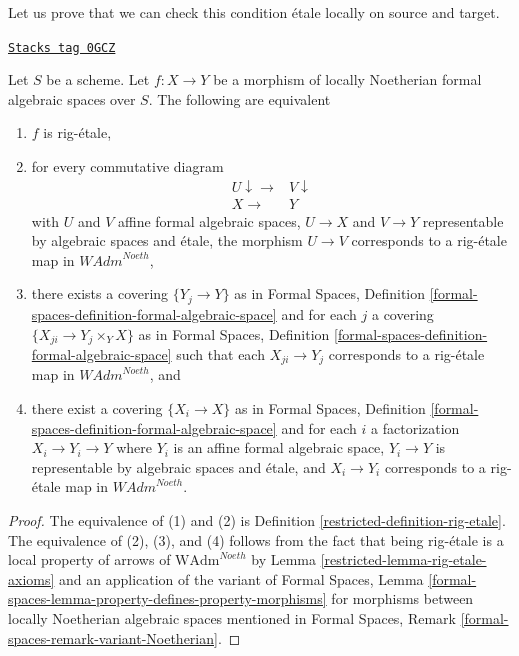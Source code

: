 Let us prove that we can check this condition \'etale locally on
source and target.

\begin{lemma}
\label{restricted-lemma-rig-etale-morphisms}
\href{https://stacks.math.columbia.edu/tag/0GCZ}{\texttt{Stacks tag 0GCZ}}

Let $S$ be a scheme. Let $f : X \to Y$ be a morphism of
locally Noetherian formal algebraic spaces over $S$.
The following are equivalent
\begin{enumerate}
\item $f$ is rig-\'etale,
\item for every commutative diagram
$$
\begin{array}{cc}U \downarrow\longrightarrow & V \downarrow \\ X \longrightarrow & Y\end{array}
$$
with $U$ and $V$ affine formal algebraic spaces, $U \to X$ and $V \to Y$
representable by algebraic spaces and \'etale, the morphism $U \to V$
corresponds to a rig-\'etale map in $\textit{WAdm}^{Noeth}$,
\item there exists a covering $\{Y_j \to Y\}$ as in
Formal Spaces,
Definition \ref{formal-spaces-definition-formal-algebraic-space}
and for each $j$
a covering $\{X_{ji} \to Y_j \times_Y X\}$ as in
Formal Spaces,
Definition \ref{formal-spaces-definition-formal-algebraic-space}
such that each $X_{ji} \to Y_j$  corresponds
to a rig-\'etale map in $\textit{WAdm}^{Noeth}$, and
\item there exist a covering $\{X_i \to X\}$ as in
Formal Spaces,
Definition \ref{formal-spaces-definition-formal-algebraic-space}
and for each $i$ a factorization $X_i \to Y_i \to Y$ where $Y_i$
is an affine formal algebraic space, $Y_i \to Y$ is representable
by algebraic spaces and \'etale, and $X_i \to Y_i$ corresponds
to a rig-\'etale map in $\textit{WAdm}^{Noeth}$.
\end{enumerate}
\end{lemma}

\begin{proof}

The equivalence of (1) and (2) is Definition \ref{restricted-definition-rig-etale}.
The equivalence of (2), (3), and (4) follows from the fact that
being rig-\'etale is a local property of arrows of
$\text{WAdm}^{Noeth}$ by Lemma \ref{restricted-lemma-rig-etale-axioms}
and an application of the variant of
Formal Spaces, Lemma
\ref{formal-spaces-lemma-property-defines-property-morphisms}
for morphisms between locally Noetherian algebraic spaces
mentioned in Formal Spaces, Remark
\ref{formal-spaces-remark-variant-Noetherian}.
\end{proof}

